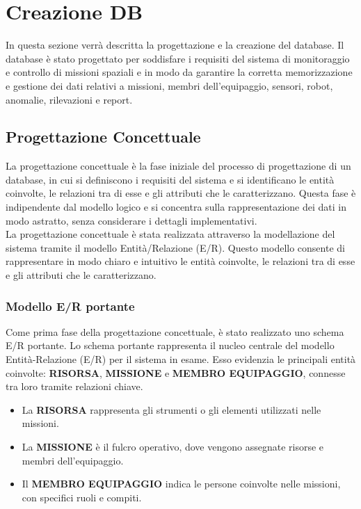 \section{Creazione DB}
In questa sezione verrà descritta la progettazione e la creazione del database. Il database è stato progettato per soddisfare i requisiti del sistema di monitoraggio e controllo di missioni spaziali e in modo da garantire la corretta memorizzazione e gestione dei dati relativi a missioni, membri dell'equipaggio, sensori, robot, anomalie, rilevazioni e report.

\subsection{Progettazione Concettuale}

La progettazione concettuale è la fase iniziale del processo di progettazione di un database, in cui si definiscono i requisiti del sistema e si identificano le entità coinvolte, le relazioni tra di esse e gli attributi che le caratterizzano. Questa fase è indipendente dal modello logico e si concentra sulla rappresentazione dei dati in modo astratto, senza considerare i dettagli implementativi. \\
La progettazione concettuale è stata realizzata attraverso la modellazione del sistema tramite il modello Entità/Relazione (E/R). Questo modello consente di rappresentare in modo chiaro e intuitivo le entità coinvolte, le relazioni tra di esse e gli attributi che le caratterizzano.

\subsubsection{Modello E/R portante}

Come prima fase della progettazione concettuale, è stato realizzato uno schema E/R portante. Lo schema portante rappresenta il nucleo centrale del modello Entità-Relazione (E/R) per il sistema in esame. Esso evidenzia le principali entità coinvolte: \textbf{RISORSA}, \textbf{MISSIONE} e \textbf{MEMBRO EQUIPAGGIO}, connesse tra loro tramite relazioni chiave.

\begin{itemize}
    \item La \textbf{RISORSA} rappresenta gli strumenti o gli elementi utilizzati nelle missioni.
    \item La \textbf{MISSIONE} è il fulcro operativo, dove vengono assegnate risorse e membri dell'equipaggio.
    \item Il \textbf{MEMBRO EQUIPAGGIO} indica le persone coinvolte nelle missioni, con specifici ruoli e compiti.
\end{itemize}

